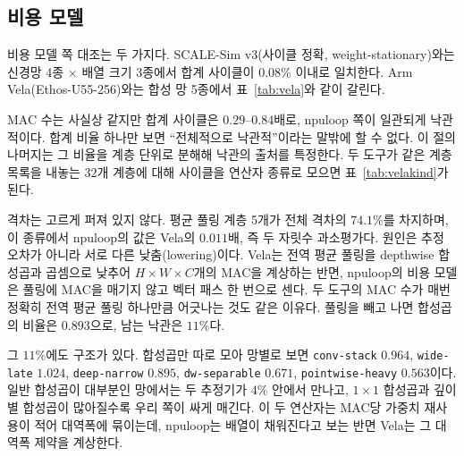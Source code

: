 \documentclass[11pt,a4paper,oneside]{report}
\newcommand{\fittable}[1]{\adjustbox{max width=\textwidth}{#1}}
\begin{document}
\subsection*{비용 모델}

비용 모델 쪽 대조는 두 가지다. SCALE-Sim v3(사이클 정확, weight-stationary)와는 신경망 4종 × 배열 크기
3종에서 합계 사이클이 $0.08\%$ 이내로 일치한다. Arm Vela(Ethos-U55-256)와는 합성 망 5종에서
표~\ref{tab:vela}와 같이 갈린다.

\begin{table}[!t]
\caption[Arm Vela(Ethos-U55-256) 대조]{Arm Vela(Ethos-U55-256)와의 대조. 같은 INT8 그래프에 대한 두 분석 추정기의 값이며, 비율은
npuloop/Vela다. 둘 다 추정값이고 실측이 아니다.}
\label{tab:vela}
\centering
\small
\fittable{}
\end{table}

MAC 수는 사실상 같지만 합계 사이클은 $0.29$--$0.84$배로, npuloop 쪽이 일관되게 낙관적이다. 합계 비율
하나만 보면 ``전체적으로 낙관적''이라는 말밖에 할 수 없다. 이 절의 나머지는 그 비율을 계층 단위로 분해해
낙관의 출처를 특정한다. 두 도구가 같은 계층 목록을 내놓는 $32$개 계층에 대해 사이클을 연산자 종류로 모으면
표~\ref{tab:velakind}가 된다.

\begin{table}[!t]
\caption[Vela 격차의 연산자별 분해]{Vela와의 사이클 격차를 연산자 종류로 분해한 것. ``격차 비중''은
$\sum(\text{Vela} - \text{npuloop})$ 가운데 그 종류가 차지하는 몫이다. 합계 비율 $0.655$는 거의 전적으로
첫 행에서 나온다.}
\label{tab:velakind}
\centering
\small
\fittable{}
\end{table}

격차는 고르게 퍼져 있지 않다. 평균 풀링 계층 5개가 전체 격차의 $74.1\%$를 차지하며, 이 종류에서 npuloop의
값은 Vela의 $0.011$배, 즉 두 자릿수 과소평가다. 원인은 추정 오차가 아니라 서로 다른 낮춤(lowering)이다.
Vela는 전역 평균 풀링을 depthwise 합성곱과 곱셈으로 낮추어 $H\times W\times C$개의 MAC을 계상하는 반면,
npuloop의 비용 모델은 풀링에 MAC을 매기지 않고 벡터 패스 한 번으로 센다. 두 도구의 MAC 수가 매번 정확히
전역 평균 풀링 하나만큼 어긋나는 것도 같은 이유다. 풀링을 빼고 나면 합성곱의 비율은 $0.893$으로, 남는
낙관은 $11\%$다.

그 $11\%$에도 구조가 있다. 합성곱만 따로 모아 망별로 보면 \texttt{conv-stack} $0.964$, \texttt{wide-late}
$1.024$, \texttt{deep-narrow} $0.895$, \texttt{dw-separable} $0.671$, \texttt{pointwise-heavy} $0.563$이다.
일반 합성곱이 대부분인 망에서는 두 추정기가 $4\%$ 안에서 만나고, $1\times1$ 합성곱과 깊이별 합성곱이
많아질수록 우리 쪽이 싸게 매긴다. 이 두 연산자는 MAC당 가중치 재사용이 적어 대역폭에 묶이는데, npuloop는
배열이 채워진다고 보는 반면 Vela는 그 대역폭 제약을 계상한다.
\end{document}
